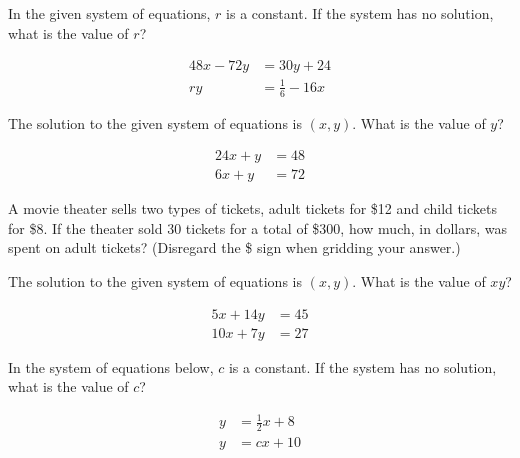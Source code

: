 In the given system of equations, \( r \) is a constant. If the system has no solution, what is the value of \( r \)?

\[
\begin{aligned}
48x - 72y &= 30y + 24 \\
ry &= \frac{1}{6} - 16x
\end{aligned}
\]

\vspace{5em}
\noindent\markforreview

\vspace{1em}

The solution to the given system of equations is \( (x, y) \). What is the value of \( y \)?

\[
\begin{aligned}
24x + y &= 48 \\
6x + y &= 72
\end{aligned}
\]

\vspace{5em}
\noindent\markforreview

\vspace{1em}

A movie theater sells two types of tickets, adult tickets for \$12 and child tickets for \$8. If the theater sold 30 tickets for a total of \$300, how much, in dollars, was spent on adult tickets? (Disregard the \$ sign when gridding your answer.)

\newpage
\noindent\markforreview

\vspace{1em}

The solution to the given system of equations is \( (x, y) \). What is the value of \( xy \)?

\[
\begin{aligned}
5x + 14y &= 45 \\
10x + 7y &= 27
\end{aligned}
\]

\vspace{2em}

\noindent\markforreview

\vspace{1em}

In the system of equations below, \( c \) is a constant. If the system has no solution, what is the value of \( c \)?

\[
\begin{aligned}
y &= \frac{1}{2}x + 8 \\
y &= cx + 10
\end{aligned}
\]

